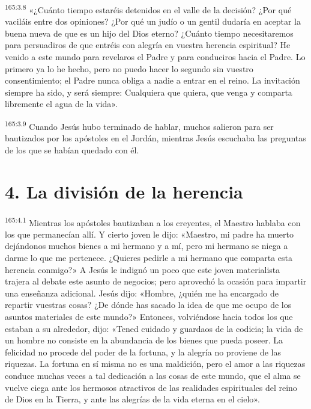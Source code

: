 \par 
\textsuperscript{165:3.8} «¿Cuánto tiempo estaréis detenidos en el valle de la decisión? ¿Por qué vaciláis entre dos opiniones? ¿Por qué un judío o un gentil dudaría en aceptar la buena nueva de que es un hijo del Dios eterno? ¿Cuánto tiempo necesitaremos para persuadiros de que entréis con alegría en vuestra herencia espiritual? He venido a este mundo para revelaros el Padre y para conduciros hacia el Padre. Lo primero ya lo he hecho, pero no puedo hacer lo segundo sin vuestro consentimiento; el Padre nunca obliga a nadie a entrar en el reino. La invitación siempre ha sido, y será siempre: Cualquiera que quiera, que venga y comparta libremente el agua de la vida».

\par 
\textsuperscript{165:3.9} Cuando Jesús hubo terminado de hablar, muchos salieron para ser bautizados por los apóstoles en el Jordán, mientras Jesús escuchaba las preguntas de los que se habían quedado con él.

\section*{4. La división de la herencia}
\par 
\textsuperscript{165:4.1} Mientras los apóstoles bautizaban a los creyentes, el Maestro hablaba con los que permanecían allí. Y cierto joven le dijo: «Maestro, mi padre ha muerto dejándonos muchos bienes a mi hermano y a mí, pero mi hermano se niega a darme lo que me pertenece. ¿Quieres pedirle a mi hermano que comparta esta herencia conmigo?» A Jesús le indignó un poco que este joven materialista trajera al debate este asunto de negocios; pero aprovechó la ocasión para impartir una enseñanza adicional. Jesús dijo: «Hombre, ¿quién me ha encargado de repartir vuestras cosas? ¿De dónde has sacado la idea de que me ocupo de los asuntos materiales de este mundo?» Entonces, volviéndose hacia todos los que estaban a su alrededor, dijo: «Tened cuidado y guardaos de la codicia; la vida de un hombre no consiste en la abundancia de los bienes que pueda poseer. La felicidad no procede del poder de la fortuna, y la alegría no proviene de las riquezas. La fortuna en sí misma no es una maldición, pero el amor a las riquezas conduce muchas veces a tal dedicación a las cosas de este mundo, que el alma se vuelve ciega ante los hermosos atractivos de las realidades espirituales del reino de Dios en la Tierra, y ante las alegrías de la vida eterna en el cielo».

